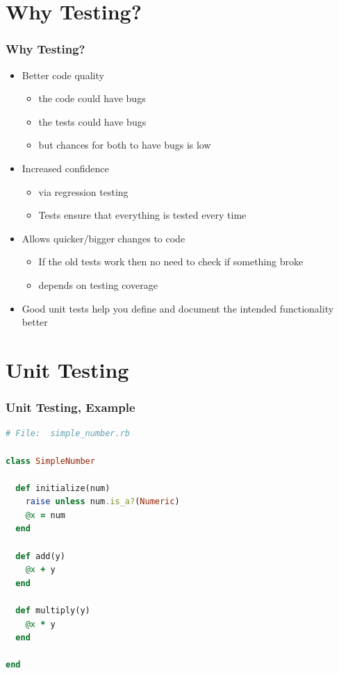 \documentclass{beamer}
\begin{document}
\section{Why Testing?}
\begin{frame}[fragile]\frametitle{Why Testing?} 
  \begin{itemize}
    \item Better code quality
    \begin{itemize}
      \item the code could have bugs
      \item the tests could have bugs
      \item but chances for both to have bugs is low
    \end{itemize}

    \item Increased confidence
    \begin{itemize}
      \item via regression testing
      \item Tests ensure that everything is tested every time
    \end{itemize}

    \item Allows quicker/bigger changes to code
    \begin{itemize}
      \item If the old tests work then no need to check if something broke
      \item depends on testing coverage
    \end{itemize}
    
    \item Good unit tests help you define and document the intended functionality better
    
  \end{itemize}
\end{frame}


\section{Unit Testing} 
\begin{frame}[fragile]\frametitle{Unit Testing, Example} 
  \begin{lstlisting}[language=ruby, escapechar={^}]
# File:  simple_number.rb
 
class SimpleNumber
 
  def initialize(num)
    raise unless num.is_a?(Numeric)
    @x = num
  end
 
  def add(y)
    @x + y
  end
 
  def multiply(y)
    @x * y
  end
 
end
  \end{lstlisting}
\end{frame}
\end{document}
